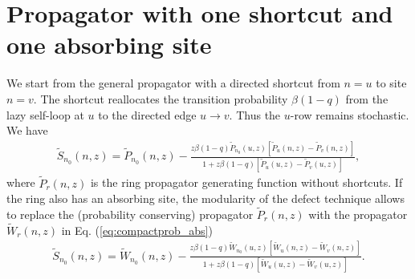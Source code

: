 \documentclass[superscriptaddress, amsmath, amssymb, aps, pre, floatfix]{revtex4-2}
\begin{document}



\section*{Propagator with one shortcut and one absorbing site}

We start from the general propagator with a directed shortcut from $n=u$ to site $n=v$.  The shortcut reallocates the transition probability \(\beta(1-q)\) from the lazy self-loop at \(u\) to the directed edge \(u\to v\).  Thus the \(u\)-row remains stochastic.  We have
\begin{align}
\widetilde{S}_{n_0}(n,z)=\widetilde{P}_{n_0}(n,z)-\frac{z\beta (1-q)\widetilde{P}_{n_0}(u,z)\left[\widetilde{P}_{u}(n,z)-\widetilde{P}_{v}(n,z)\right]}{1+z\beta(1-q)\left[\widetilde{P}_{u}(u,z)-\widetilde{P}_{v}(u,z)\right]},
\label{eq:one_def_prop}
\end{align}
where $\widetilde{P}_{r}(n,z)$ is the ring propagator generating function without shortcuts. If the ring also has an absorbing site, the modularity of the defect technique allows to replace the (probability conserving) propagator $\widetilde{P}_{r}(n,z)$ with the propagator $\widetilde{W}_{r}(n,z)$ in Eq. (\ref{eq:compactprob_abs})
\begin{align}
\widetilde{S}_{n_0}(n,z)=\widetilde{W}_{n_0}(n,z)-\frac{z\beta (1-q)\widetilde{W}_{n_0}(u,z)\left[\widetilde{W}_{u}(n,z)-\widetilde{W}_{v}(n,z)\right]}{1+z\beta(1-q)\left[\widetilde{W}_{u}(u,z)-\widetilde{W}_{v}(u,z)\right]}.
\label{eq:one_def_prop_abs}
\end{align}
\end{document}
